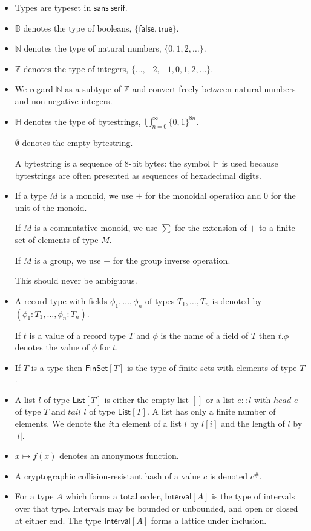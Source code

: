 \documentclass[a4paper]{article}
\newcounter{note}
\newcommand{\s}{\textsf}  %
\newcommand{\true}{\textsf{true}}
\newcommand{\false}{\textsf{false}}
\newcommand{\hash}[1]{\ensuremath{#1^{\#}}}
\newcommand{\List}[1]{\ensuremath{\s{List}[#1]}}
\newcommand{\FinSet}[1]{\ensuremath{\s{FinSet}[#1]}}
\newcommand{\Interval}[1]{\ensuremath{\s{Interval}[#1]}}
\newcommand\B{\ensuremath{\mathbb{B}}}
\newcommand\N{\ensuremath{\mathbb{N}}}
\newcommand\Z{\ensuremath{\mathbb{Z}}}
\renewcommand\H{\ensuremath{\mathbb{H}}}
\newcommand{\emptyBs}{\ensuremath{\emptyset}}
\begin{document}
\begin{itemize}
\item Types are typeset in $\mathsf{sans~serif}$.

\item \B{} denotes the type of booleans, $\{\false, \true\}$.
\item \N{} denotes the type of natural numbers, $\{0, 1, 2, \ldots\}$.
\item \Z{} denotes the type of integers, $\{\ldots, -2, -1, 0, 1, 2, \ldots\}$.
\item We regard $\N$ as a subtype of $\Z$ and convert freely between
  natural numbers and non-negative integers.
\item \H{} denotes the type of bytestrings,
  $\bigcup_{n=0}^{\infty}\{0,1\}^{8n}$.

  \emptyBs{} denotes the empty bytestring.

  A bytestring is a sequence of 8-bit bytes: the symbol $\H$ is used because bytestrings are often
  presented as sequences of hexadecimal digits.

\item If a type $M$ is a monoid, we use $+$ for the monoidal operation and $0$
  for the unit of the monoid.

  If $M$ is a commutative monoid, we use $\sum$ for the extension of $+$ to a finite set of elements of
  type $M$.

  If $M$ is a group, we use $-$ for the group
  inverse operation.

  This should never be ambiguous.

\item A record type with fields $\phi_1, \ldots, \phi_n$ of types $T_1,
  \ldots, T_n$ is denoted by $(\phi_1 : T_1, \ldots, \phi_n : T_n)$.

  If $t$ is a value of a record type $T$ and $\phi$ is the name
  of a field of $T$ then $t.\phi$ denotes the value of $\phi$ for
  $t$.

\item If $T$ is a type then $\FinSet{T}$ is the type of finite sets
  with elements of type $T$.

\item A list $l$ of type $\List{T}$ is either the empty list
  $[]$ or a list $e :: l$ with $head$ $e$ of type $T$ and
  $tail$ $l$ of type $\List{T}$. A list has only a finite
  number of elements.  We denote the $i$th element of a list $l$ by
  $l[i]$ and the length of $l$ by $\left|l\right|$.

\item $x \mapsto f(x)$ denotes an anonymous function.

\item A cryptographic collision-resistant hash of a value $c$ is denoted $\hash{c}$.

\item For a type $A$ which forms a total order, $\Interval{A}$ is the
  type of intervals over that type. Intervals may be bounded or
  unbounded, and open or closed at either end. The type $\Interval{A}$
  forms a lattice under inclusion.
\end{itemize}
\end{document}
